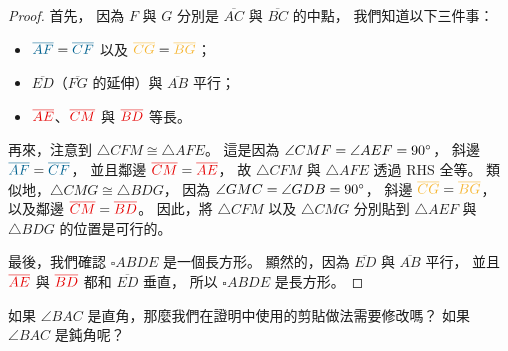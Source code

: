 \documentclass{article}
\begin{document}
\begin{multicols}{2}
\begin{proof}
	首先，
	因為 $F$ 與 $G$ 分別是 $\overline{AC}$ 與 $\overline{BC}$ 的中點，
	我們知道以下三件事：
	\begin{itemize}
		\item $\blue{\overline{AF}}=\blue{\overline{CF}}$ 以及 $\yellow{\overline{CG}}=\yellow{\overline{BG}}$；
		\item $\overline{ED}$（$\overline{FG}$ 的延伸）與 $\overline{AB}$ 平行；
		\item $\red{\overline{AE}}$、$\red{\overline{CM}}$ 與 $\red{\overline{BD}}$ 等長。
	\end{itemize}
	再來，注意到 $\triangle{CFM}\cong\triangle{AFE}$。
	這是因為 $\angle{CMF}=\angle{AEF}=90^{\circ}$，
	斜邊 $\blue{\overline{AF}}=\blue{\overline{CF}}$，
	並且鄰邊 $\red{\overline{CM}}=\red{\overline{AE}}$，
	故 $\triangle{CFM}$ 與 $\triangle{AFE}$ 透過 RHS 全等。
	類似地，$\triangle{CMG}\cong\triangle{BDG}$，
	因為 $\angle{GMC}=\angle{GDB}=90^{\circ}$，
	斜邊 $\yellow{\overline{CG}}=\yellow{\overline{BG}}$，
	以及鄰邊 $\red{\overline{CM}}=\red{\overline{BD}}$。
	因此，將 $\triangle{CFM}$ 以及 $\triangle{CMG}$ 分別貼到 $\triangle{AEF}$ 與 $\triangle{BDG}$ 的位置是可行的。

	最後，我們確認 $\square{ABDE}$ 是一個長方形。
	顯然的，因為 $\overline{ED}$ 與 $\overline{AB}$ 平行，
	並且 $\red{\overline{AE}}$ 與 $\red{\overline{BD}}$ 都和 $\overline{ED}$ 垂直，
	所以 $\square{ABDE}$ 是長方形。
\end{proof}

\begin{remark}
	如果 $\angle{BAC}$ 是直角，那麼我們在證明中使用的剪貼做法需要修改嗎？
	如果 $\angle{BAC}$ 是鈍角呢？
\end{remark}


\end{multicols}
\end{document}
